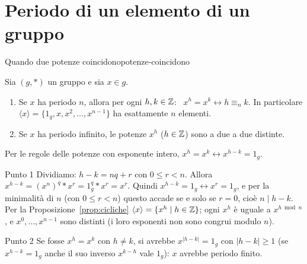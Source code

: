 \section{Periodo di un elemento di un gruppo}\label{sec:periodo}


\begin{concetto}
\begin{Teorema}{Quando due potenze coincidono}{potenze-coincidono}
    \begin{prerequisiti}
    \end{prerequisiti}
    Sia $(g, *)$ un gruppo e sia $x \in g$.
    \begin{enumerate}
        \item Se $x$ ha periodo $n$, allora per ogni $h, k \in \mathbb{Z}$: \ $x^h = x^k \leftrightarrow h \equiv_n k$. In particolare
              $\langle x \rangle = \{1_g, x, x^2, \dots, x^{n - 1}\}$ ha esattamente $n$ elementi.
        \item Se $x$ ha periodo infinito, le potenze $x^h$ ($h \in \mathbb{Z}$) sono a due a due distinte.
    \end{enumerate}
\end{Teorema}
\begin{dimostrazione}
    Per le regole delle potenze con esponente intero, $x^h = x^k \leftrightarrow x^{h - k} = 1_g$.
    \begin{caso}{Punto 1}
        Dividiamo: $h - k = nq + r$ con $0 \leq r < n$. Allora $x^{h - k} = (x^n)^q * x^r = 1_g^q * x^r = x^r$. Quindi $x^{h - k} = 1_g \leftrightarrow x^r = 1_g$, e per
        la minimalità di $n$ (con $0 \leq r < n$) questo accade se e solo se $r = 0$, cioè $n \mid h - k$. Per la Proposizione~\ref{prop:cicliche}
        $\langle x \rangle = \{x^h \mid h \in \mathbb{Z}\}$; ogni $x^h$ è uguale a $x^{h \bmod n}$, e $x^0, \dots, x^{n - 1}$ sono distinti (i loro esponenti non sono congrui modulo $n$).
    \end{caso}
    \begin{caso}{Punto 2}
        Se fosse $x^h = x^k$ con $h \neq k$, si avrebbe $x^{|h - k|} = 1_g$ con $|h - k| \geq 1$ (se $x^{h - k} = 1_g$ anche il suo inverso $x^{k - h}$ vale $1_g$):
        $x$ avrebbe periodo finito.
    \end{caso}
\end{dimostrazione}
\end{concetto}

